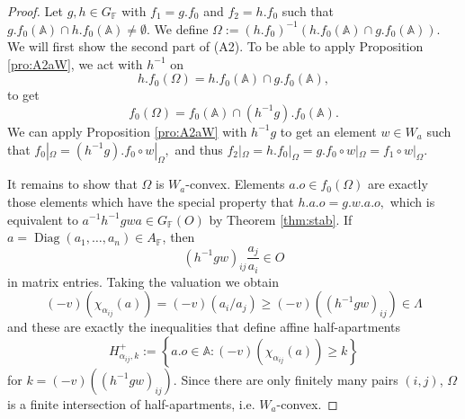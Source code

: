 \documentclass[12pt]{amsart}
\newcommand{\F}{\mathbb{F} }
\newcommand{\A}{\mathbb{A}}
\newcommand{\diag}[1]{\operatorname{Diag}\left( #1_1, \ldots , #1_n\right) }
\numberwithin{equation}{section}
\theoremstyle{remark} %
\begin{document}
\begin{proof}
	Let $g,h \in G_\F$ with $f_1=g.f_0$ and $f_2=h.f_0$ such that $g.f_0(\A)\cap h.f_0(\A)\neq \emptyset$. We define $\Omega := (h.f_0)^{-1}(h.f_0(\A)\cap g.f_0(\A))$. We will first show the second part of (A2). To be able to apply Proposition \ref{pro:A2aW}, we act with $h^{-1}$ on
	$$
	h.f_0(\Omega)=h.f_0(\A)\cap g.f_0(\A),
	$$
	to get
	$$
	f_0(\Omega)=f_0(\A)\cap (h^{-1}g).f_0(\A).
	$$
	We can apply Proposition \ref{pro:A2aW} with $h^{-1}g$ to get an element $w \in W_a$ such that $
	f_0|_\Omega = (h^{-1}g).f_0 \circ w |_\Omega, 
	$
	and thus $f_2|_\Omega = h.f_0|_\Omega = g.f_0\circ w |_\Omega=f_1\circ w |_\Omega$.
	
	It remains to show that $\Omega$ is $W_a$-convex. Elements $a.o \in f_0(\Omega)$ are exactly those elements which have the special property that
	$
	h.a.o = g.w.a.o,
	$
	which is equivalent to $a^{-1}h^{-1}gwa \in G_\F(O)$ by Theorem \ref{thm:stab}. If $a = \diag{a} \in A_\F$, then
	$$
	(h^{-1}gw)_{ij}\frac{a_j}{a_i} \in O
	$$
	in matrix entries. Taking the valuation we obtain
	$$
	(-v)(\chi_{\alpha_{ij}}(a)) = (-v)(a_i/a_j) \geq (-v)((h^{-1}gw)_{ij}) \in \Lambda
	$$
	and these are exactly the inequalities that define affine half-apartments
	$$
	H_{\alpha_{ij},k}^+ := \left\{  a.o \in \A \colon (-v)(\chi_{\alpha_{ij}}(a)) \geq k  \right\}
	$$
	for $k = (-v)((h^{-1}gw)_{ij})  $. Since there are only finitely many pairs $(i,j)$, $\Omega$ is a finite intersection of half-apartments, i.e. $W_a$-convex.
\end{proof}


 
 \newpage
 
 
	
\end{document}
